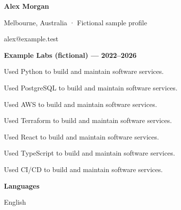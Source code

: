 \documentclass[10pt,a4paper]{article}
\begin{document}
{\LARGE\bfseries\color{navy} Alex Morgan}\par
Melbourne, Australia · Fictional sample profile\par
alex@example.test\par
{\large\bfseries\color{navy} Example Labs (fictional) — 2022–2026}\par
Used Python to build and maintain software services.\par
Used PostgreSQL to build and maintain software services.\par
Used AWS to build and maintain software services.\par
Used Terraform to build and maintain software services.\par
Used React to build and maintain software services.\par
Used TypeScript to build and maintain software services.\par
Used CI/CD to build and maintain software services.\par
{\large\bfseries\color{navy} Languages}\par
English\par
\end{document}
